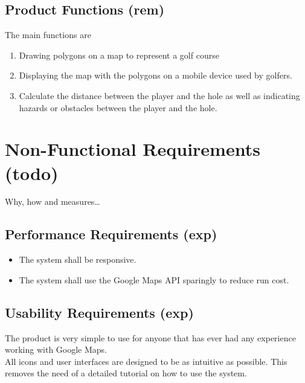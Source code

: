 \documentclass{article}
\begin{document}
    \subsection{Product Functions (rem)}
    The main functions are
    \begin{enumerate}
        \item
            Drawing polygons on a map to represent a golf course
        \item
            Displaying the map with the polygons on a mobile device used by
            golfers.
        \item
            Calculate the distance between the player and the hole as well as
            indicating hazards or  obstacles between the player and the hole.
    \end{enumerate}

    \newpage


    \section{Non-Functional Requirements (todo)}

    Why, how and measures\ldots

    \subsection{Performance Requirements (exp)}
    \begin{itemize}
        \item
            The system shall be responsive.
        \item
            The system shall use the Google Maps API sparingly to reduce run
            cost.
    \end{itemize}

    \subsection{Usability Requirements (exp)}

    The product is very simple to use for anyone that has ever had any
    experience working with Google Maps.\\ All icons and user interfaces are
    designed to be as intuitive as possible. This removes the need of a detailed
    tutorial on how to use the system.

    \newpage
\end{document}
